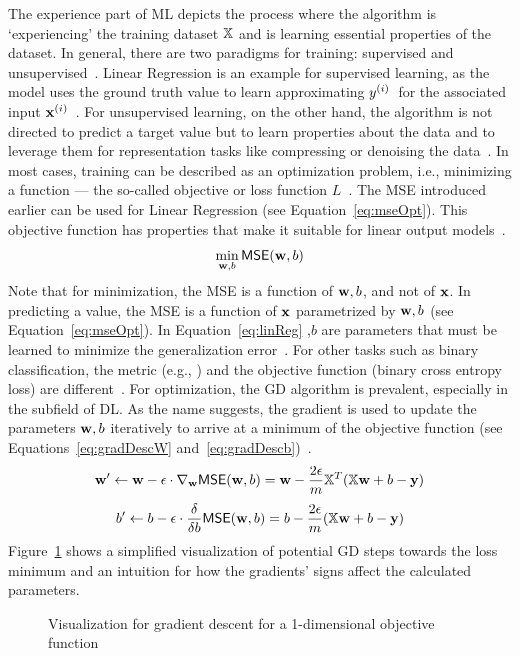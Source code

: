 The experience part of \ac{ML} depicts the process where the algorithm is `experiencing' the training
dataset $\mathbb{X}$ and is learning essential properties of the dataset.
In general, there are two paradigms for training: supervised and
unsupervised~\citep{goodfellow_deep_2016}.
Linear Regression is an example for supervised learning, as the model uses the ground truth value
to learn approximating $y^{(i)}$\ for the associated input
$\textbf{x}^{(i)}$~\citep{alzubi_machine_2018,goodfellow_deep_2016}.
For unsupervised learning, on the other hand, the algorithm is not directed to predict a target
value but to learn properties about the data and to leverage them for representation tasks
like compressing or denoising the data~\citep{goodfellow_deep_2016,geron_hands-machine_2017}.
In most cases, training can be described as an optimization problem, i.e., minimizing a
function --- the so-called objective or loss function $L$~\citep{goodfellow_deep_2016}.
The \ac{MSE} introduced earlier can be used for Linear Regression (see Equation~\ref{eq:mseOpt}).
This objective function has properties that make it suitable for linear output
models~\citep{goodfellow_deep_2016}.
\begin{equation}\label{eq:mseOpt}
    \min_{\textbf{w},b} \textsf{MSE}(\textbf{w},b)
\end{equation}
Note that for minimization, the \ac{MSE} is a function of $\textbf{w},b$, and not of $\textbf{x}$.
In predicting a value, the \ac{MSE} is a function of $\textbf{x}$ parametrized by $\textbf{w},b$ (see
Equation~\ref{eq:mseOpt}).
In Equation~\ref{eq:linReg} \w,$b$ are parameters that must be learned to minimize
the generalization error~\citep{james_introduction_2013,geron_hands-machine_2017}.
For other tasks such as binary classification, the metric (e.g., \fone) and the
objective function (binary cross entropy loss) are different~\citep{geron_hands-machine_2017,
ho_real-world-weight_2020}.
For optimization, the \ac{GD} algorithm is prevalent, especially in the subfield of \ac{DL}.
As the name suggests, the gradient is used to update the parameters $\textbf{w},b$ iteratively  to arrive
at a minimum of the objective function (see Equations~\ref{eq:gradDescW}
and~\ref{eq:gradDescb})~\citep{geron_hands-machine_2017}.
\begin{equation}\label{eq:gradDescW}
    \textbf{w}'\leftarrow \textbf{w}-\epsilon\cdot\nabla_{\textbf{w}} \textsf{MSE}(\textbf{w},b)
        = \textbf{w}-\frac{2\epsilon}{m}\mathbb{X}^T (\mathbb{X}\textbf{w}+b-\textbf{y})
\end{equation}
\begin{equation}\label{eq:gradDescb}
    b'\leftarrow b-\epsilon\cdot\frac{\delta}{\delta b} \textsf{MSE}(\textbf{w},b)
        = b-\frac{2\epsilon}{m}(\mathbb{X}\textbf{w}+b-\textbf{y})
\end{equation}
Figure~\ref{fig:grad-desc} shows a simplified visualization of potential \ac{GD} steps towards the
loss minimum and an intuition for how the gradients' signs affect the calculated parameters.
\begin{figure}[hb]
    \centering
    
    \caption[Gradient descent visualization]{%
        Visualization for gradient descent for
        a 1-dimensional objective function~\citep{goodfellow_deep_2016}\label{fig:grad-desc}
    }
\end{figure}

